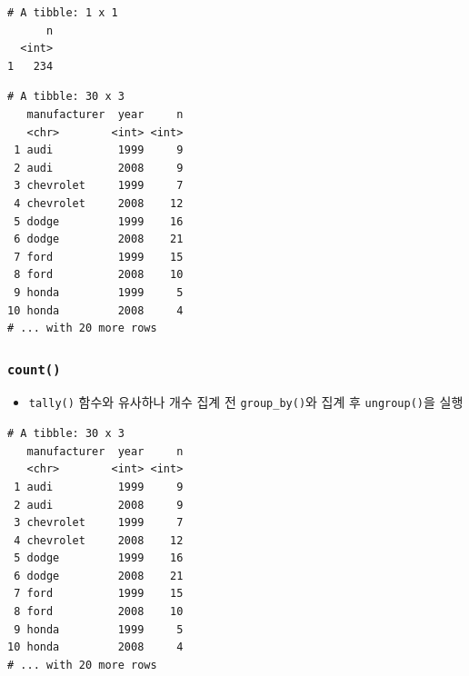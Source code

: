 \documentclass[
  11pt,
]{krantz}
\newenvironment{Shaded}{\begin{snugshade}}{\end{snugshade}}
\newcommand{\CommentTok}[1]{\textcolor[rgb]{0.37,0.37,0.37}{\textit{#1}}}
\newcommand{\KeywordTok}[1]{\textcolor[rgb]{0.27,0.27,0.27}{\textbf{#1}}}
\newcommand{\NormalTok}[1]{#1}
\newcommand{\OperatorTok}[1]{\textcolor[rgb]{0.43,0.43,0.43}{\textbf{#1}}}
\newcommand{\StringTok}[1]{\textcolor[rgb]{0.5,0.5,0.5}{#1}}
\providecommand{\tightlist}{%
  \setlength{\itemsep}{0pt}\setlength{\parskip}{0pt}}
\begin{document}
\begin{verbatim}
# A tibble: 1 x 1
      n
  <int>
1   234
\end{verbatim}

\begin{Shaded}
\end{Shaded}

\begin{verbatim}
# A tibble: 30 x 3
   manufacturer  year     n
   <chr>        <int> <int>
 1 audi          1999     9
 2 audi          2008     9
 3 chevrolet     1999     7
 4 chevrolet     2008    12
 5 dodge         1999    16
 6 dodge         2008    21
 7 ford          1999    15
 8 ford          2008    10
 9 honda         1999     5
10 honda         2008     4
# ... with 20 more rows
\end{verbatim}

\normalsize

\hypertarget{count}{%
\subsubsection*{\texorpdfstring{\texttt{count()}}{count()}}\label{count}}


\begin{itemize}
\tightlist
\item
  \texttt{tally()} 함수와 유사하나 개수 집계 전 \texttt{group\_by()}와 집계 후 \texttt{ungroup()}을 실행
\end{itemize}

\footnotesize

\begin{Shaded}
\end{Shaded}

\begin{verbatim}
# A tibble: 30 x 3
   manufacturer  year     n
   <chr>        <int> <int>
 1 audi          1999     9
 2 audi          2008     9
 3 chevrolet     1999     7
 4 chevrolet     2008    12
 5 dodge         1999    16
 6 dodge         2008    21
 7 ford          1999    15
 8 ford          2008    10
 9 honda         1999     5
10 honda         2008     4
# ... with 20 more rows
\end{verbatim}
\end{document}

